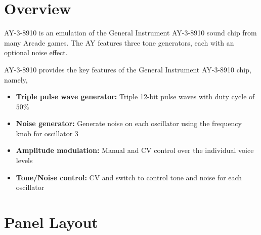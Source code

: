 \documentclass[12pt,letter]{article}
\begin{document}


\section{Overview}

AY-3-8910 is an emulation of the General Instrument AY-3-8910 sound chip from
many Arcade games. The AY features three tone generators, each with an optional
noise effect.

AY-3-8910 provides the key features of the General Instrument AY-3-8910 chip,
namely,
\begin{itemize}
  \item \textbf{Triple pulse wave generator:} Triple 12-bit pulse waves with duty cycle of $50\%$
  \item \textbf{Noise generator:} Generate noise on each oscillator using the frequency knob for oscillator 3
  \item \textbf{Amplitude modulation:} Manual and CV control over the individual voice levels
  \item \textbf{Tone/Noise control:} CV and switch to control tone and noise for each oscillator
\end{itemize}


\clearpage
\section{Panel Layout}
\end{document}

